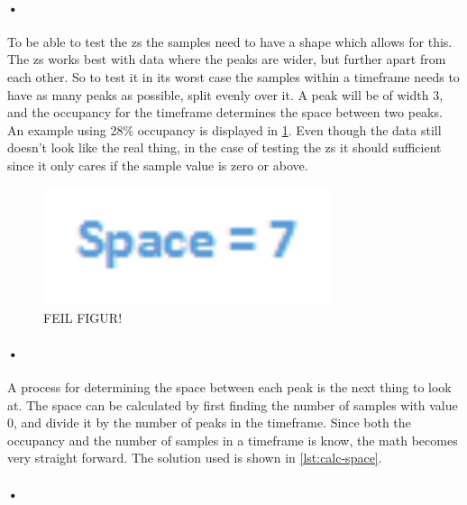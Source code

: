 \documentclass[a4paper, 12pt]{report}
\begin{document}
\paragraph{•}
To be able to test the \gls{zs} the samples need to have a shape which allows for this.
The \gls{zs} works best with data where the peaks are wider, but further apart from each other.
So to test it in its worst case the samples within a timeframe needs to have as many peaks as possible, split evenly over it.
A peak will be of width 3, and the occupancy for the timeframe determines the space between two peaks.
An example using 28\% occupancy is displayed in \ref{fig:normal-data-shape}.
Even though the data still doesn't look like the real thing, in the case of testing the \gls{zs} it should sufficient since it only cares if the sample value is zero or above.

\begin{figure}[h!]
	\centering
		\includegraphics[width=0.75\textwidth]{images/normal-data-shape.png}
		\caption{FEIL FIGUR!}
		\label{fig:normal-data-shape}
\end{figure}

\paragraph{•}
A process for determining the space between each peak is the next thing to look at.
The space can be calculated by first finding the number of samples with value 0, and divide it by the number of peaks in the timeframe.
Since both the occupancy and the number of samples in a timeframe is know, the math becomes very straight forward.
The solution used is shown in \ref{lst:calc-space}.

\paragraph{•}
\begin{minipage}{\linewidth}

\end{minipage}
\end{document}
